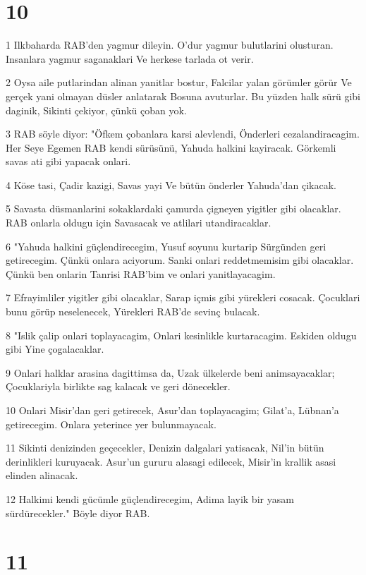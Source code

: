 \chapter{10}

\par 1 Ilkbaharda RAB'den yagmur dileyin. O'dur yagmur bulutlarini olusturan. Insanlara yagmur saganaklari Ve herkese tarlada ot verir.
\par 2 Oysa aile putlarindan alinan yanitlar bostur, Falcilar yalan görümler görür Ve gerçek yani olmayan düsler anlatarak Bosuna avuturlar. Bu yüzden halk sürü gibi daginik, Sikinti çekiyor, çünkü çoban yok.
\par 3 RAB söyle diyor: "Öfkem çobanlara karsi alevlendi, Önderleri cezalandiracagim. Her Seye Egemen RAB kendi sürüsünü, Yahuda halkini kayiracak. Görkemli savas ati gibi yapacak onlari.
\par 4 Köse tasi, Çadir kazigi, Savas yayi Ve bütün önderler Yahuda'dan çikacak.
\par 5 Savasta düsmanlarini sokaklardaki çamurda çigneyen yigitler gibi olacaklar. RAB onlarla oldugu için Savasacak ve atlilari utandiracaklar.
\par 6 "Yahuda halkini güçlendirecegim, Yusuf soyunu kurtarip Sürgünden geri getirecegim. Çünkü onlara aciyorum. Sanki onlari reddetmemisim gibi olacaklar. Çünkü ben onlarin Tanrisi RAB'bim ve onlari yanitlayacagim.
\par 7 Efrayimliler yigitler gibi olacaklar, Sarap içmis gibi yürekleri cosacak. Çocuklari bunu görüp neselenecek, Yürekleri RAB'de sevinç bulacak.
\par 8 "Islik çalip onlari toplayacagim, Onlari kesinlikle kurtaracagim. Eskiden oldugu gibi Yine çogalacaklar.
\par 9 Onlari halklar arasina dagittimsa da, Uzak ülkelerde beni animsayacaklar; Çocuklariyla birlikte sag kalacak ve geri dönecekler.
\par 10 Onlari Misir'dan geri getirecek, Asur'dan toplayacagim; Gilat'a, Lübnan'a getirecegim. Onlara yeterince yer bulunmayacak.
\par 11 Sikinti denizinden geçecekler, Denizin dalgalari yatisacak, Nil'in bütün derinlikleri kuruyacak. Asur'un gururu alasagi edilecek, Misir'in krallik asasi elinden alinacak.
\par 12 Halkimi kendi gücümle güçlendirecegim, Adima layik bir yasam sürdürecekler." Böyle diyor RAB.

\chapter{11}

